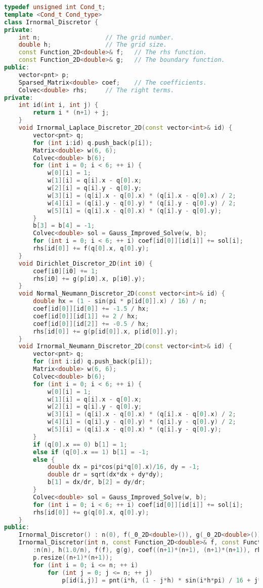 \documentclass{ctexart}
\begin{document}
\begin{lstlisting}[language=c++]
typedef unsigned int Cond_t;
template <Cond_t Cond_type>
class Irnormal_Discretor {
private:
	int n;					// The grid number.
	double h;				// The grid size.
	const Function_2D<double>& f;	// The rhs function.
	const Function_2D<double>& g;	// The boundary function.
public:
	vector<pnt> p;
	Sparsed_Matrix<double> coef;	// The coefficients.
	Colvec<double> rhs;		// The right terms.
private:
	int id(int i, int j) {
		return i * (n+1) + j;
	}
	void Irnormal_Laplace_Discretor_2D(const vector<int>& id) {
		vector<pnt> q;
		for (int i:id) q.push_back(p[i]);
		Matrix<double> w(6, 6);
		Colvec<double> b(6);
		for (int i = 0; i < 6; ++ i) {
			w[0][i] = 1;
			w[1][i] = q[i].x - q[0].x;
			w[2][i] = q[i].y - q[0].y;
			w[3][i] = (q[i].x - q[0].x) * (q[i].x - q[0].x) / 2;
			w[4][i] = (q[i].y - q[0].y) * (q[i].y - q[0].y) / 2;
			w[5][i] = (q[i].x - q[0].x) * (q[i].y - q[0].y);
		}
		b[3] = b[4] = -1;
		Colvec<double> sol = Gauss_Improved_Solve(w, b);
		for (int i = 0; i < 6; ++ i) coef[id[0]][id[i]] += sol[i];
		rhs[id[0]] += f(q[0].x, q[0].y);
	}
	void Dirichlet_Discretor_2D(int i0) {
		coef[i0][i0] += 1;
		rhs[i0] += g(p[i0].x, p[i0].y);
	}
	void Normal_Neumann_Discretor_2D(const vector<int>& id) {
		double hx = (1 - sin(pi * p[id[0]].x) / 16) / n;
		coef[id[0]][id[0]] += -1.5 / hx;
		coef[id[0]][id[1]] += 2 / hx;
		coef[id[0]][id[2]] += -0.5 / hx;
		rhs[id[0]] += g(p[id[0]].x, p[id[0]].y);
	}
	void Irnormal_Neumann_Discretor_2D(const vector<int>& id) {
		vector<pnt> q;
		for (int i:id) q.push_back(p[i]);
		Matrix<double> w(6, 6);
		Colvec<double> b(6);
		for (int i = 0; i < 6; ++ i) {
			w[0][i] = 1;
			w[1][i] = q[i].x - q[0].x;
			w[2][i] = q[i].y - q[0].y;
			w[3][i] = (q[i].x - q[0].x) * (q[i].x - q[0].x) / 2;
			w[4][i] = (q[i].y - q[0].y) * (q[i].y - q[0].y) / 2;
			w[5][i] = (q[i].x - q[0].x) * (q[i].y - q[0].y);
		}
		if (q[0].x == 0) b[1] = 1;
		else if (q[0].x == 1) b[1] = -1;
		else {
			double dx = pi*cos(pi*q[0].x)/16, dy = -1;
			double dr = sqrt(dx*dx + dy*dy);
			b[1] = dx/dr, b[2] = dy/dr;
		}
		Colvec<double> sol = Gauss_Improved_Solve(w, b);
		for (int i = 0; i < 6; ++ i) coef[id[0]][id[i]] += sol[i];
		rhs[id[0]] += g(q[0].x, q[0].y);
	}
public:
	Irnormal_Discretor() : n(0), f(_0_2D<double>()), g(_0_2D<double>()), coef(0, 0), rhs(0) {}
	Irnormal_Discretor(int n, const Function_2D<double>& f, const Function_2D<double>& g)
		:n(n), h(1.0/n), f(f), g(g), coef((n+1)*(n+1), (n+1)*(n+1)), rhs((n+1)*(n+1)) {
		p.resize((n+1)*(n+1));
		for (int i = 0; i <= n; ++ i)
			for (int j = 0; j <= n; ++ j)
				p[id(i,j)] = pnt(i*h, (1 - j*h) * sin(i*h*pi) / 16 + j*h);

\end{lstlisting}
\end{document}
